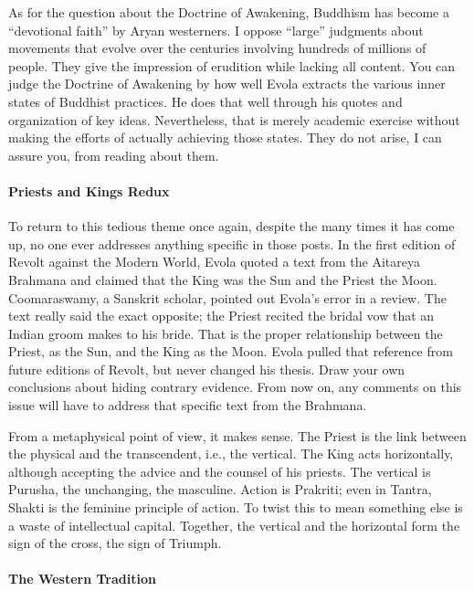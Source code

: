 As for the question about the Doctrine of Awakening, Buddhism has become a ``devotional faith'' by Aryan westerners. I oppose ``large'' judgments about movements that evolve over the centuries involving hundreds of millions of people. They give the impression of erudition while lacking all content. You can judge the Doctrine of Awakening by how well Evola extracts the various inner states of Buddhist practices. He does that well through his quotes and organization of key ideas. Nevertheless, that is merely academic exercise without making the efforts of actually achieving those states. They do not arise, I can assure you, from reading about them.

\paragraph{Priests and Kings Redux}


To return to this tedious theme once again, despite the many times it has come up, no one ever addresses anything specific in those posts. In the first edition of Revolt against the Modern World, Evola quoted a text from the Aitareya Brahmana and claimed that the King was the Sun and the Priest the Moon. Coomaraswamy, a Sanskrit scholar, pointed out Evola's error in a review. The text really said the exact opposite; the Priest recited the bridal vow that an Indian groom makes to his bride. That is the proper relationship between the Priest, as the Sun, and the King as the Moon. Evola pulled that reference from future editions of Revolt, but never changed his thesis. Draw your own conclusions about hiding contrary evidence. From now on, any comments on this issue will have to address that specific text from the Brahmana.

From a metaphysical point of view, it makes sense. The Priest is the link between the physical and the transcendent, i.e., the vertical. The King acts horizontally, although accepting the advice and the counsel of his priests. The vertical is Purusha, the unchanging, the masculine. Action is Prakriti; even in Tantra, Shakti is the feminine principle of action. To twist this to mean something else is a waste of intellectual capital. Together, the vertical and the horizontal form the sign of the cross, the sign of Triumph.

\paragraph{The Western Tradition}


